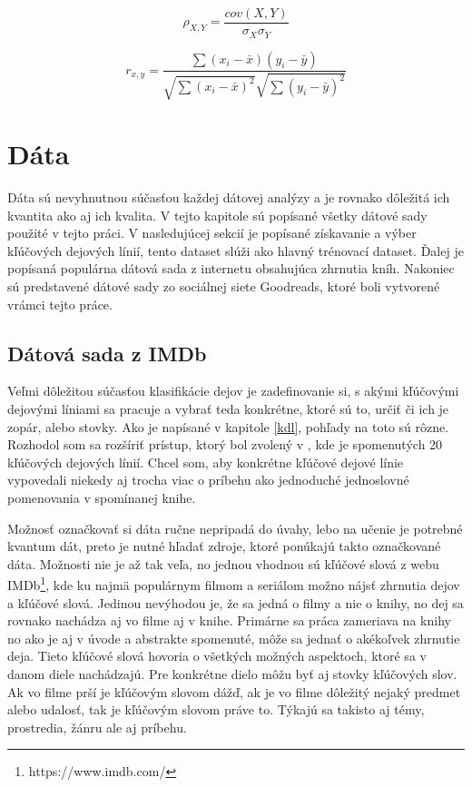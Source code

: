\begin{equation}
	\rho_{X,Y} =  \dfrac{cov(X,Y)}{\sigma_{X} \sigma_{Y}} \label{rovnicaPearson}
\end{equation}

\begin{equation}
	r_{x,y} =  \dfrac{\sum{(x_{i}-\bar{x})(y_{i}-\bar{y})}}{\sqrt{\sum{(x_{i}-\bar{x})^2}} \sqrt{\sum{(y_{i}-\bar{y})^2}}} \label{rovnicaSpearman}
\end{equation}


\chapter{Dáta} \label{data}
Dáta sú nevyhnutnou súčasťou každej dátovej analýzy a je rovnako dôležitá ich kvantita ako aj ich kvalita. V tejto kapitole sú popísané všetky dátové sady použité v tejto práci. V nasledujúcej sekcií je popísané získavanie a výber kľúčových dejových línií, tento dataset slúži ako hlavný trénovací dataset. Ďalej je popísaná populárna dátová sada z internetu obsahujúca zhrnutia kníh. Nakoniec sú predstavené dátové sady zo sociálnej siete Goodreads, ktoré boli vytvorené vrámci tejto práce.

\section{Dátová sada z IMDb} \label{imdbdata}
Veľmi dôležitou súčasťou klasifikácie dejov je zadefinovanie si, s akými kľúčovými dejovými líniami sa pracuje a vybrať teda konkrétne, ktoré sú to, určiť či ich je zopár, alebo stovky. Ako je napísané v kapitole \ref{kdl}, pohľady na toto sú rôzne. Rozhodol som sa rozšíriť prístup, ktorý bol zvolený v \cite{Tobias:1993}, kde je spomenutých 20 kľúčových dejových línií. Chcel som, aby konkrétne kľúčové dejové línie vypovedali niekedy aj trocha viac o príbehu ako jednoduché jednoslovné pomenovania v spomínanej knihe.

Možnosť označkovať si dáta ručne nepripadá do úvahy, lebo na učenie je potrebné kvantum dát, preto je nutné hľadať zdroje, ktoré ponúkajú takto označkované dáta. Možnosti nie je až tak veľa, no jednou vhodnou sú kľúčové slová z webu IMDb\footnote{https://www.imdb.com/}, kde ku najmä populárnym filmom a seriálom možno nájsť zhrnutia dejov a kľúčové slová. Jedinou nevýhodou je, že sa jedná o filmy a nie o knihy, no dej sa rovnako nachádza aj vo filme aj v knihe. Primárne sa práca zameriava na knihy no ako je aj v úvode a abstrakte spomenuté, môže sa jednať o akékoľvek zhrnutie deja. Tieto kľúčové slová hovoria o všetkých možných aspektoch, ktoré sa v danom diele nachádzajú. Pre konkrétne dielo môžu byť aj stovky kľúčových slov. Ak vo filme prší je kľúčovým slovom dážď, ak je vo filme dôležitý nejaký predmet alebo udalosť, tak je kľúčovým slovom práve to. Týkajú sa takisto aj témy, prostredia, žánru ale aj príbehu.

